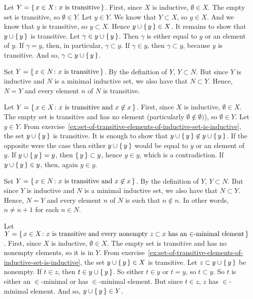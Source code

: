 \documentclass[12pt]{article}
\theoremstyle{definition}
\newenvironment{customthm}[1]
  {\renewcommand\theinnercustomthm{#1}\innercustomthm}
  {\endinnercustomthm}
\begin{document}
\begin{customthm}{I.1.4}\label{ex:set-of-transitive-elements-of-inductive-set-is-inductive}
    Let $Y = \{\,{x \in X \colon x \text{ is transitive}}\,\}$. First, since $X$ is inductive, $\emptyset \in X$. The empty set is transitive, so $\emptyset \in Y$. Let $y \in Y$. We know that $Y \subset X$, so $y \in X$. And we know that $y$ is transitive, so $y \subset X$. Hence $y \cup \{\,{y}\,\} \in X$. It remains to show that $y \cup \{\,{y}\,\}$ is transitive. Let $\gamma \in y \cup \{\,{y}\,\}$. Then $\gamma$ is either equal to $y$ or an element of $y$. If $\gamma = y$, then, in particular, $\gamma \subset y$. If $\gamma \in y$, then $\gamma \subset y$, because $y$ is transitive. And so, $\gamma \subset y \cup \{\,{y}\,\}$.
    
    Set $Y = \{\,{x \in N \colon x \text{ is transitive}}\,\}$. By the definition of $Y$, $Y \subset N$. But since $Y$ is inductive and $N$ is a minimal inductive set, we also have that $N \subset Y$. Hence, $N=Y$ and every element $n$ of $N$ is transitive.
\end{customthm}

\begin{customthm}{I.1.5}\label{ex:set-of-transitive-elements-with-x-not-in-x-of-inductive-set-is-inductive}
    Let $Y = \{\,{x \in X \colon x \text{ is transitive and } x \not\in x}\,\}$. First, since $X$ is inductive, $\emptyset \in X$. The empty set is transitive and has no element (particularly $\emptyset \not\in \emptyset)$), so $\emptyset \in Y$. Let $y \in Y$. From exercise~\ref{ex:set-of-transitive-elements-of-inductive-set-is-inductive}, the set $y \cup \{\,{y}\,\}$ is transitive. It is enough to show that $y \cup \{\,{y}\,\} \not\in y \cup \{\,{y}\,\}$. If the opposite were the case then either $y \cup \{\,{y}\,\}$ would be equal to $y$ or an element of $y$. If $y \cup \{\,{y}\,\} = y$, then $\{\,{y}\,\} \subset y$, hence $y \in y$, which is a contradiction. If $y \cup \{\,{y}\,\} \in y$, then, again $y \in y$.
    
    Set $Y = \{\,{x \in N \colon x \text{ is transitive and } x \not\in x}\,\}$. By the definition of $Y$, $Y \subset N$. But since $Y$ is inductive and $N$ is a minimal inductive set, we also have that $N \subset Y$. Hence, $N=Y$ and every element $n$ of $N$ is such that $n \not\in n$. In other words, $n \neq n+1$ for each $n \in N$.
\end{customthm}

\begin{customthm}{I.1.6}
    Let $Y = \{\,{x \in X \colon x \text{ is transitive and every nonempty } z \subset x \text{ has an $\in$-minimal element}}\,\}$. First, since $X$ is inductive, $\emptyset \in X$. The empty set is transitive and has no nonempty elements, so it is in $Y$. From exercise~\ref{ex:set-of-transitive-elements-of-inductive-set-is-inductive}, the set $y \cup \{\,{y}\,\} \in X$ is transitive. Let $z \subset y \cup \{\,{y}\,\}$ be nonempty. If $t \in z$, then $t \in y \cup \{\,{y}\,\}$. So either $t \in y$ or $t=y$, so $t \subset y$. So $t$ is either an $\in$-minimal or has $\in$-minimal element. But since $t \in z$, $z$ has $\in$-minimal element. And so, $y \cup \{\,{y}\,\} \in Y$.
\end{customthm}
\end{document}
